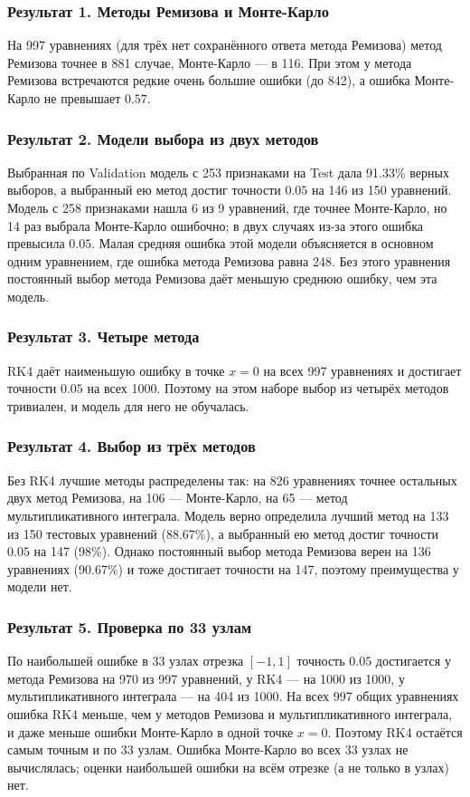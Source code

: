\documentclass[14pt,a4paper]{extarticle}
\begin{document}
\subsubsection*{Результат 1. Методы Ремизова и Монте-Карло}
На 997 уравнениях (для трёх нет сохранённого ответа метода Ремизова)
метод Ремизова точнее в 881 случае, Монте-Карло --- в 116. При этом
у метода Ремизова встречаются редкие очень большие ошибки (до 842),
а ошибка Монте-Карло не превышает $0.57$.

\subsubsection*{Результат 2. Модели выбора из двух методов}
Выбранная по Validation модель с 253 признаками на Test дала
91.33\% верных выборов, а выбранный ею метод достиг точности $0.05$
на 146 из 150 уравнений. Модель с 258 признаками нашла 6 из 9 уравнений,
где точнее Монте-Карло, но 14 раз выбрала Монте-Карло ошибочно; в двух
случаях из-за этого ошибка превысила $0.05$. Малая средняя ошибка этой
модели объясняется в основном одним уравнением, где ошибка метода
Ремизова равна 248. Без этого уравнения постоянный выбор метода
Ремизова даёт меньшую среднюю ошибку, чем эта модель.

\subsubsection*{Результат 3. Четыре метода}
RK4 даёт наименьшую ошибку в точке $x=0$ на всех 997 уравнениях
и достигает точности $0.05$ на всех 1000. Поэтому на этом наборе выбор
из четырёх методов тривиален, и модель для него не обучалась.

\subsubsection*{Результат 4. Выбор из трёх методов}
Без RK4 лучшие методы распределены так: на 826 уравнениях точнее
остальных двух метод Ремизова, на 106 --- Монте-Карло, на 65 --- метод
мультипликативного интеграла. Модель верно определила лучший метод на 133 из 150
тестовых уравнений (88.67\%), а выбранный ею метод достиг точности $0.05$
на 147 (98\%). Однако постоянный выбор метода Ремизова верен на 136
уравнениях (90.67\%) и тоже достигает точности на 147, поэтому
преимущества у модели нет.

\subsubsection*{Результат 5. Проверка по 33 узлам}
По наибольшей ошибке в 33 узлах отрезка $[-1,1]$ точность $0.05$
достигается у метода Ремизова на 970 из 997 уравнений, у RK4 --- на 1000
из 1000, у мультипликативного интеграла --- на 404 из 1000. На всех
997 общих уравнениях ошибка RK4 меньше, чем у методов Ремизова
и мультипликативного интеграла, и даже меньше ошибки Монте-Карло
в одной точке $x=0$. Поэтому RK4 остаётся самым точным и по 33 узлам.
Ошибка Монте-Карло во всех 33 узлах не вычислялась; оценки наибольшей
ошибки на всём отрезке (а не только в узлах) нет.
\end{document}
